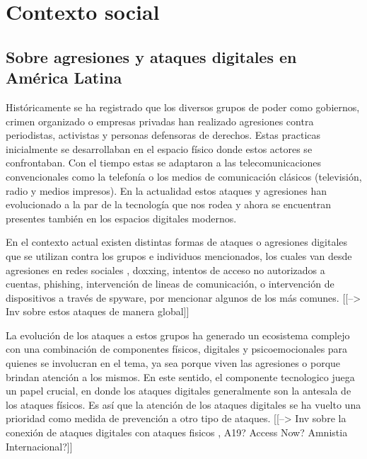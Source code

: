 \documentclass[12pt]{caltech_thesis}
\begin{document}


\chapter{Contexto social}

\section{Sobre agresiones y ataques digitales en América Latina}

Históricamente se ha registrado que los diversos grupos de poder como gobiernos, crimen organizado o empresas privadas han realizado agresiones contra periodistas, activistas y personas defensoras de derechos. Estas practicas inicialmente se desarrollaban en el espacio físico donde estos actores se confrontaban. Con el tiempo estas se adaptaron a las telecomunicaciones convencionales como la telefonía o los medios de comunicación clásicos (televisión, radio y medios impresos). En la actualidad estos ataques y agresiones han evolucionado a la par de la tecnología que nos rodea y ahora se encuentran presentes también en los espacios digitales modernos.

En el contexto actual existen distintas formas de ataques o agresiones digitales que se utilizan contra los grupos e individuos mencionados, los cuales van desde agresiones en redes sociales , doxxing, intentos de acceso no autorizados a cuentas, phishing, intervención de lineas de comunicación, o intervención de dispositivos a través de spyware, por mencionar algunos de los más comunes. [[--> Inv sobre estos ataques de manera global]]

La evolución de los ataques a estos grupos ha generado un ecosistema complejo con una combinación de componentes físicos, digitales y psicoemocionales para quienes se involucran en el tema, ya sea porque viven las agresiones o porque brindan atención a los mismos. En este sentido, el componente tecnologico juega un papel crucial, en donde los ataques digitales generalmente son la antesala de los ataques físicos. Es así que la atención de los ataques digitales se ha vuelto una prioridad como medida de prevención a otro tipo de ataques. [[--> Inv sobre la conexión de ataques digitales con ataques fisicos , A19? Access Now? Amnistia Internacional?]]
\end{document}
